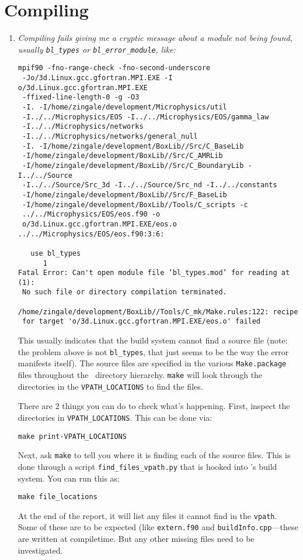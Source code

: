 \section{Compiling}

\begin{enumerate}

\item {\em Compiling fails giving me a cryptic message about a module not
  being found, usually {\tt bl\_types} or {\tt bl\_error\_module}, like:
\begin{verbatim}
mpif90 -fno-range-check -fno-second-underscore
 -Jo/3d.Linux.gcc.gfortran.MPI.EXE -I o/3d.Linux.gcc.gfortran.MPI.EXE
 -ffixed-line-length-0 -g -O3
 -I. -I/home/zingale/development/Microphysics/util
 -I../../Microphysics/EOS -I../../Microphysics/EOS/gamma_law
 -I../../Microphysics/networks
 -I../../Microphysics/networks/general_null
 -I. -I/home/zingale/development/BoxLib//Src/C_BaseLib
 -I/home/zingale/development/BoxLib//Src/C_AMRLib
 -I/home/zingale/development/BoxLib//Src/C_BoundaryLib -I../../Source
 -I../../Source/Src_3d -I../../Source/Src_nd -I../../constants
 -I/home/zingale/development/BoxLib//Src/F_BaseLib
 -I/home/zingale/development/BoxLib//Tools/C_scripts -c
 ../../Microphysics/EOS/eos.f90 -o
 o/3d.Linux.gcc.gfortran.MPI.EXE/eos.o
../../Microphysics/EOS/eos.f90:3:6:

   use bl_types
      1
Fatal Error: Can't open module file ‘bl_types.mod’ for reading at (1):
 No such file or directory compilation terminated.

/home/zingale/development/BoxLib//Tools/C_mk/Make.rules:122: recipe
 for target 'o/3d.Linux.gcc.gfortran.MPI.EXE/eos.o' failed
\end{verbatim}
}

This usually indicates that the build system cannot find a source file
(note: the problem above is not {\tt bl\_types}, that just seems to be
the way the error manifests itself).  The source files are specified
in the various {\tt Make.package} files throughout the
\castro\ directory hierarchy.  {\tt make} will look through the
directories in the {\tt VPATH\_LOCATIONS} to find the files.

There are 2 things you can do to check what's happening.  First, inspect
the directories in {\tt VPATH\_LOCATIONS}.  This can be done via:
\begin{verbatim}
make print-VPATH_LOCATIONS
\end{verbatim}

Next, ask {\tt make} to tell you where it is finding each of the source
files.  This is done through a script {\tt find\_files\_vpath.py}
 that is hooked into \castro's build system.  You can run this as:
\begin{verbatim}
make file_locations
\end{verbatim}
At the end of the report, it will list any files it cannot find in
the {\tt vpath}.  Some of these are to be expected (like {\tt extern.f90}
and {\tt buildInfo.cpp}---these are written at compiletime.  But any
other missing files need to be investigated.

\end{enumerate}


